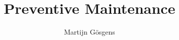 

\title{Preventive Maintenance}
\author{Martijn G\"{o}sgens}
\maketitle



\tableofcontents





%












